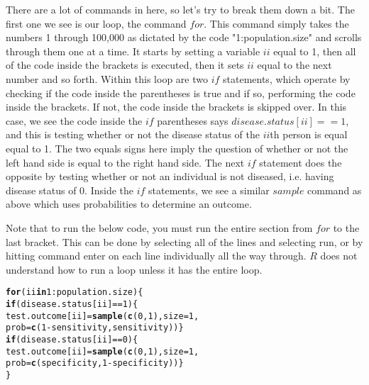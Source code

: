\documentclass[11pt]{article}\usepackage[]{graphicx}\usepackage[]{color}
\makeatletter
\newcommand{\hlnum}[1]{\textcolor[rgb]{0.686,0.059,0.569}{#1}}%
\newcommand{\hlopt}[1]{\textcolor[rgb]{0,0,0}{#1}}%
\newcommand{\hlstd}[1]{\textcolor[rgb]{0.345,0.345,0.345}{#1}}%
\newcommand{\hlkwa}[1]{\textcolor[rgb]{0.161,0.373,0.58}{\textbf{#1}}}%
\newcommand{\hlkwb}[1]{\textcolor[rgb]{0.69,0.353,0.396}{#1}}%
\newcommand{\hlkwc}[1]{\textcolor[rgb]{0.333,0.667,0.333}{#1}}%
\newcommand{\hlkwd}[1]{\textcolor[rgb]{0.737,0.353,0.396}{\textbf{#1}}}%
\newenvironment{kframe}{%
 \def\at@end@of@kframe{}%
 \ifinner\ifhmode%
  \def\at@end@of@kframe{\end{minipage}}%
  \begin{minipage}{\columnwidth}%
 \fi\fi%
 \def\FrameCommand##1{\hskip\@totalleftmargin \hskip-\fboxsep
 \colorbox{shadecolor}{##1}\hskip-\fboxsep
     \hskip-\linewidth \hskip-\@totalleftmargin \hskip\columnwidth}%
 \MakeFramed {\advance\hsize-\width
   \@totalleftmargin\z@ \linewidth\hsize
   \@setminipage}}%
 {\par\unskip\endMakeFramed%
 \at@end@of@kframe}
\newenvironment{knitrout}{}{} %
\makeatother
\begin{document}
There are a lot of commands in here, so let's try to break them down a bit.  The first one we see is our loop, the command $for$.  This command simply takes the numbers 1 through 100,000 as dictated by the code "1:population.size" and scrolls through them one at a time.  It starts by setting a variable $ii$ equal to 1, then all of the code inside the brackets is executed, then it sets $ii$ equal to the next number and so forth.  Within this loop are two $if$ statements, which operate by checking if the code inside the parentheses is true and if so, performing the code inside the brackets.  If not, the code inside the brackets is skipped over.  In this case, we see the code inside the $if$ parentheses says $disease.status[ii] ==1$, and this is testing whether or not the disease status of the $ii$th person is equal equal to 1.  The two equals signs here imply the question of whether or not the left hand side is equal to the right hand side.  The next $if$ statement does the opposite by testing whether or not an individual is not diseased, i.e. having disease status of 0.  Inside the $if$ statements, we see a similar $sample$ command as above which uses probabilities to determine an outcome. 

Note that to run the below code, you must run the entire section from $for$ to the last bracket.  This can be done by selecting all of the lines and selecting run, or by hitting command enter on each line individually all the way through.  $R$ does not understand how to run a loop unless it has the entire loop.  
\begin{knitrout}
\color{fgcolor}\begin{kframe}
\begin{alltt}
\hlkwa{for} \hlstd{(ii} \hlkwa{in} \hlnum{1}\hlopt{:}\hlstd{population.size) \{}
  \hlkwa{if}\hlstd{(disease.status[ii]} \hlopt{==} \hlnum{1}\hlstd{) \{}
    \hlstd{test.outcome[ii]} \hlkwb{=} \hlkwd{sample}\hlstd{(}\hlkwd{c}\hlstd{(}\hlnum{0}\hlstd{,}\hlnum{1}\hlstd{),} \hlkwc{size}\hlstd{=}\hlnum{1}\hlstd{,}
                                   \hlkwc{prob} \hlstd{=} \hlkwd{c}\hlstd{(}\hlnum{1} \hlopt{-} \hlstd{sensitivity, sensitivity))\}}
  \hlkwa{if}\hlstd{(disease.status[ii]} \hlopt{==} \hlnum{0}\hlstd{) \{}
   \hlstd{test.outcome[ii]} \hlkwb{=} \hlkwd{sample}\hlstd{(}\hlkwd{c}\hlstd{(}\hlnum{0}\hlstd{,}\hlnum{1}\hlstd{),} \hlkwc{size}\hlstd{=}\hlnum{1}\hlstd{,}
                                   \hlkwc{prob} \hlstd{=} \hlkwd{c}\hlstd{(specificity,} \hlnum{1} \hlopt{-} \hlstd{specificity))\}}
\hlstd{\}}
\end{alltt}
\end{kframe}
\end{knitrout}
\end{document}
